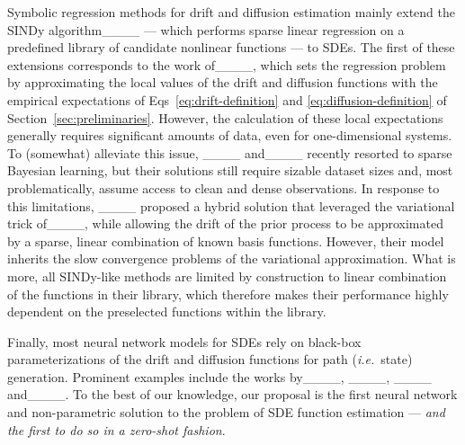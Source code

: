 %
Symbolic regression methods for drift and diffusion estimation mainly extend the SINDy algorithm____ --- which performs sparse linear regression on a predefined library of candidate nonlinear functions --- to SDEs.
%
The first of these extensions corresponds to the work of____, which sets the regression problem by approximating the local values of the drift and diffusion functions with the empirical expectations of Eqs~\ref{eq:drift-definition} and \ref{eq:diffusion-definition} of Section~\ref{sec:preliminaries}.  
%
However, the calculation of these local expectations generally requires significant amounts of data, even for one-dimensional systems.
%
To (somewhat) alleviate this issue, ____ and____ recently resorted to sparse Bayesian learning, but their solutions still require sizable dataset sizes and, most problematically, assume access to clean and dense observations.
%
In response to this limitations, ____ proposed a hybrid solution that leveraged the variational trick of____, while allowing the drift of the prior process to be approximated by a sparse, linear combination of known basis functions.
%
However, their model inherits the slow convergence problems of the variational approximation. 
%
What is more, all SINDy-like methods are limited by construction to linear combination of the functions in their library, 
%
which therefore makes their performance highly dependent on the preselected functions within the library.

Finally, most neural network models for SDEs rely on black-box parameterizations of the drift and diffusion functions for path (\textit{i.e.}~state) generation. 
%
Prominent examples include the works by____, ____, ____ and____. 
%
To the best of our knowledge, our proposal is the first neural network and non-parametric solution to the problem of SDE function estimation --- \textit{and the first to do so in a zero-shot fashion}.

